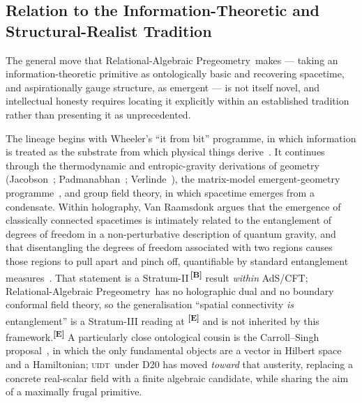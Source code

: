 \documentclass[12pt,a4paper,twoside]{article}
\theoremstyle{plain}
\theoremstyle{definition}
\theoremstyle{remark}
\newcommand{\ProjectShort}{Relational-Algebraic Pregeometry}
\newcommand{\RAP}{\ProjectShort}
\newcommand{\UIDT}{\textsc{uidt}} %
\newcommand{\catmark}[1]{\textsuperscript{\textsf{\textbf{[#1]}}}}
\begin{document}
\subsection{Relation to the Information-Theoretic and Structural-Realist Tradition}
\label{subsec:prior-art}

The general move that \RAP\ makes --- taking an information-theoretic
primitive as ontologically basic and recovering spacetime, and
aspirationally gauge structure, as emergent --- is not itself novel, and
intellectual honesty requires locating it explicitly within an
established tradition rather than presenting it as unprecedented.

The lineage begins with Wheeler's ``it from bit'' programme, in which
information is treated as the substrate from which physical things
derive~\cite{wheeler1990}. It continues through the thermodynamic and
entropic-gravity derivations of geometry
(Jacobson~\cite{jacobson1995}; Padmanabhan~\cite{padmanabhan2010};
Verlinde~\cite{verlinde2011}), the matrix-model emergent-geometry
programme~\cite{ikkt1997,steinacker2010}, and group field theory, in
which spacetime emerges from a condensate. Within holography, Van
Raamsdonk argues that the emergence of classically connected spacetimes
is intimately related to the entanglement of degrees of freedom in a
non-perturbative description of quantum gravity, and that disentangling
the degrees of freedom associated with two regions causes those regions
to pull apart and pinch off, quantifiable by standard entanglement
measures~\cite{vanraamsdonk2010}. That statement is a
Stratum-II\,\catmark{B} result \emph{within} AdS/CFT; \RAP\ has no
holographic dual and no boundary conformal field theory, so the
generalisation ``spatial connectivity \emph{is} entanglement'' is a
Stratum-III reading at \catmark{E} and is not inherited by this
framework.\catmark{E} A particularly close ontological cousin is the
Carroll--Singh proposal~\cite{carrollsingh2018}, in which the only
fundamental objects are a vector in Hilbert space and a Hamiltonian;
\UIDT\ under D20 has moved \emph{toward} that austerity, replacing a
concrete real-scalar field with a finite algebraic candidate, while
sharing the aim of a maximally frugal primitive.
\end{document}
